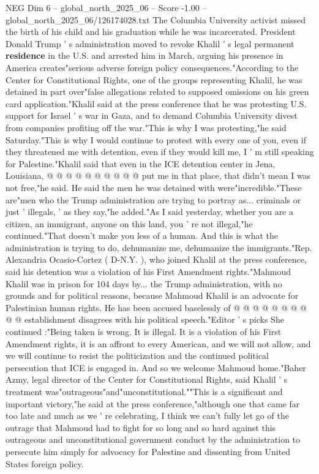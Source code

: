 \begin{textsample}{NEG Dim 6 – global\_north\_2025\_06 – Score -1.00 – global\_north\_2025\_06/126174028.txt}  \label{ex:f6_neg_427}
The Columbia University activist missed the birth of his child and his graduation while he was incarcerated.
President Donald Trump ' s administration moved to revoke Khalil ' s legal permanent \textbf{residence} in the U.S. and arrested him in March, arguing his presence in America creates"serious adverse foreign policy consequences."According to the Center for Constitutional Rights, one of the groups representing Khalil, he was detained in part over"false allegations related to supposed omissions on his green card application."Khalil said at the press conference that he was protesting U.S. support for Israel ' s war in Gaza, and to demand Columbia University divest from companies profiting off the war."This is why I was protesting,"he said Saturday."This is why I would continue to protest with every one of you, even if they threatened me with detention, even if they would kill me, I ' m still speaking for Palestine."Khalil said that even in the ICE detention center in Jena, Louisiana, @ @ @ @ @ @ @ @ @ @ put me in that place, that didn't mean I was not free,"he said.
He said the men he was detained with were"incredible."These are"men who the Trump administration are trying to portray as... criminals or just ' illegals, ' as they say,"he added."As I said yesterday, whether you are a citizen, an immigrant, anyone on this land, you ' re not illegal,"he continued."That doesn't make you less of a human.
And this is what the administration is trying to do, dehumanize me, dehumanize the immigrants."Rep.
Alexandria Ocasio-Cortez ( D-N.Y. ), who joined Khalil at the press conference, said his detention was a violation of his First Amendment rights."Mahmoud Khalil was in prison for 104 days by... the Trump administration, with no grounds and for political reasons, because Mahmoud Khalil is an advocate for Palestinian human rights.
He has been accused baselessly of @ @ @ @ @ @ @ @ @ @ establishment disagrees with his political speech."Editor ' s picks She continued :"Being taken is wrong.
It is illegal.
It is a violation of his First Amendment rights, it is an affront to every American, and we will not allow, and we will continue to resist the politicization and the continued political persecution that ICE is engaged in.
And so we welcome Mahmoud home."Baher Azmy, legal director of the Center for Constitutional Rights, said Khalil ' s treatment was"outrageous"and"unconstitutional.""This is a significant and important victory,"he said at the press conference,"although one that came far too late and much as we ' re celebrating, I think we can't fully let go of the outrage that Mahmoud had to fight for so long and so hard against this outrageous and unconstitutional government conduct by the administration to persecute him simply for advocacy for Palestine and dissenting from United States foreign policy.

\end{textsample}
